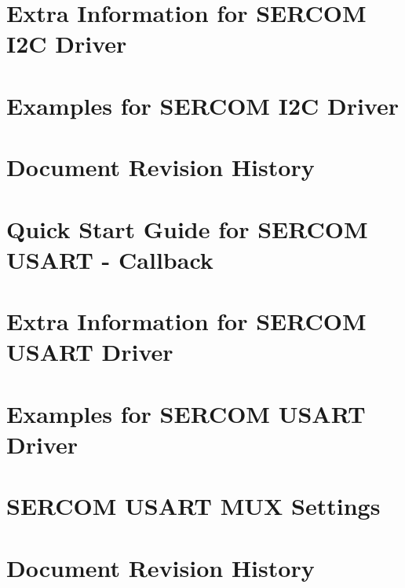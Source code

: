 \documentclass[twoside]{book}
\newcommand{\+}{\discretionary{\mbox{\scriptsize$\hookleftarrow$}}{}{}}
\begin{document}
\chapter{Extra Information for SERCOM I2C Driver}
\label{asfdoc_sam0_sercom_i2c_extra_info_page}

\chapter{Examples for SERCOM I2C Driver}
\label{asfdoc_sam0_sercom_i2c_exqsg}

\chapter{Document Revision History}
\label{asfdoc_sam0_sercom_i2c_document_revision_history}

\chapter{Quick Start Guide for SERCOM USART -\/ Callback}
\label{asfdoc_sam0_sercom_usart_callback_use_case}

\chapter{Extra Information for SERCOM USART Driver}
\label{asfdoc_sam0_sercom_usart_extra}

\chapter{Examples for SERCOM USART Driver}
\label{asfdoc_sam0_sercom_usart_exqsg}

\chapter{SERCOM USART MUX Settings}
\label{asfdoc_sam0_sercom_usart_mux_settings}

\chapter{Document Revision History}
\label{asfdoc_sam0_sercom_usart_document_revision_history}

\end{document}
